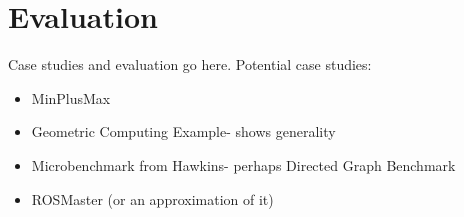 \section{Evaluation}

Case studies and evaluation go here.
Potential case studies:
\begin{itemize}
  \item MinPlusMax
  \item Geometric Computing Example-  shows generality
  \item Microbenchmark from Hawkins- perhaps Directed Graph Benchmark
  \item ROSMaster (or an approximation of it)
\end{itemize}

